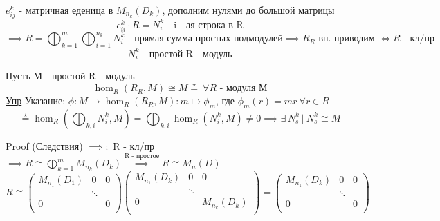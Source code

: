\documentclass[a4paper]{article}
\begin{document}
\begin{tcolorbox}
$ e_{ij}^{k} $ - матричная еденица в $ M_{n_k}(D_k) $, дополним нулями до большой
матрицы
\[
    e_{ii}^{k} \cdot R = N_i^k \text{ - i - ая строка в R}
\]
\[
    \implies R = \bigoplus_{k=1}^{m}\bigoplus_{i=1}^{n_k} N_i^k \text{ - прямая сумма простых
    подмодулей} \implies R_R \text{ вп. приводим } \iff R \text{ - кл/пр}
\]
\[
    N_i^k \text{ - простой R - модуль}
\]

Пусть М - простой R - модуль
\[
    \hom_R(R_R, M) \cong M \stackrel{\star}{=} \ \forall R \text{ - модуля М}
\]
\underline{Упр} Указание: $ \phi: M \to \hom_R(R_R, M): m \mapsto \phi_m $,
где $ \phi_m(r) = mr \ \forall r \in R $ 
\[
    \stackrel{\star}{=} \hom_R\left(\bigoplus_{k,i} N_i^k, M\right)
    = \bigoplus_{k,i}\hom_R(N_i^k, M) \neq 0 \implies \exists \, N_s^k \ | \ 
    N_s^k \cong M
\]

\underline{Proof} (Следствия) $ \implies: $ R - кл/пр $ \implies R \cong
\bigoplus_{k=1}^{m} M_{n_k}(D_k) \stackrel{\text{R - простое}}{\implies} R \cong
M_n(D)$ 
\[
    R \cong \begin{pmatrix}
    M_{n_1}(D_1) & 0 & 0 \\
     & \ddots  & \\
     0&  & 0 \\
    
    \end{pmatrix}
    \begin{pmatrix}
    M_{n_1}(D_k) & 0 & 0 \\
     & \ddots  & \\
     0&  & M_{n_k}(D_k) \\
    
    \end{pmatrix}
    =
    \begin{pmatrix}
    M_{n_1}(D_k) & 0 & 0 \\
     & \ddots  & \\
     0&  & 0 \\
    
    \end{pmatrix}
\]
\end{tcolorbox}
\end{document}
